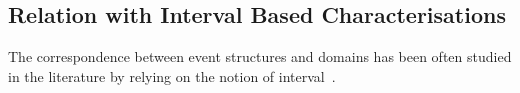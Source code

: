 \documentclass[conference]{IEEEtran}
\newcommand{\pgfBox}{
  \begin{pgfonlayer}{background} 
    \fill[blue!2,thick,draw=black!50,rounded corners,inner sep=3mm] ([xshift=-1.5pt]current bounding box.south west) rectangle ([xshift=1.5pt]current bounding box.north east);
  \end{pgfonlayer}
}
\newcommand{\zeveq}[0]{\ensuremath{\mathcal{E}_{eq}}}
\newcommand{\eveq}[1]{\ensuremath{\zeveq({#1})}}
\newcommand{\zdomeq}[0]{\ensuremath{\mathcal{D}_{eq}}}
\newcommand{\domeq}[1]{\ensuremath{\zdomeq({#1})}}
\begin{document}
        
      
  


  
  




\subsection{Relation with Interval Based Characterisations}
\label{ss:intervals}

The correspondence between event structures and domains has been often
studied in the literature by relying on the notion of
interval~\cite{Winskel:phd,NPW:PNES,Win:ES,Dro:ESD}.
\end{document}
